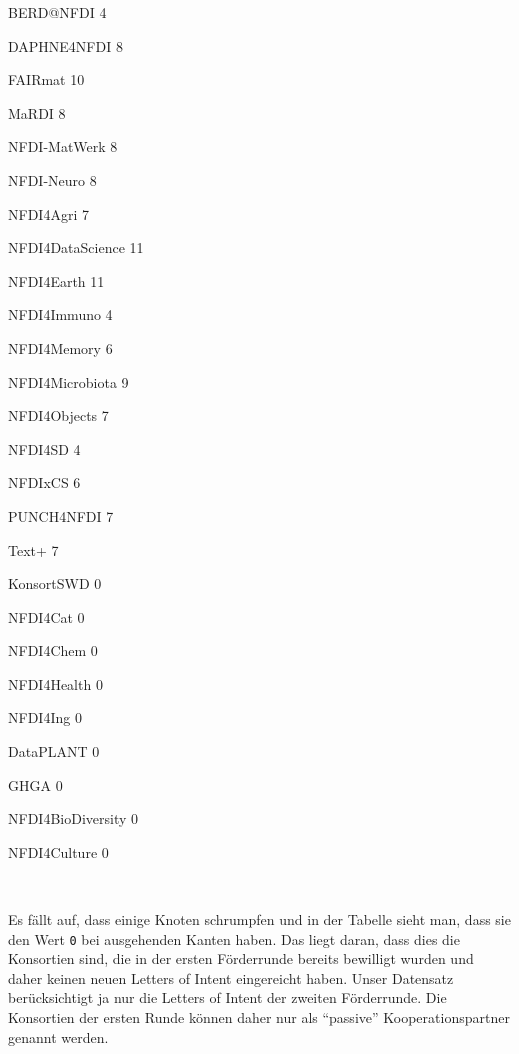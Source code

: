 \documentclass[11pt]{article}
\begin{document}
    \begin{description*}
\item[BERD@NFDI] 4
\item[DAPHNE4NFDI] 8
\item[FAIRmat] 10
\item[MaRDI] 8
\item[NFDI-MatWerk] 8
\item[NFDI-Neuro] 8
\item[NFDI4Agri] 7
\item[NFDI4DataScience] 11
\item[NFDI4Earth] 11
\item[NFDI4Immuno] 4
\item[NFDI4Memory] 6
\item[NFDI4Microbiota] 9
\item[NFDI4Objects] 7
\item[NFDI4SD] 4
\item[NFDIxCS] 6
\item[PUNCH4NFDI] 7
\item[Text+] 7
\item[KonsortSWD] 0
\item[NFDI4Cat] 0
\item[NFDI4Chem] 0
\item[NFDI4Health] 0
\item[NFDI4Ing] 0
\item[DataPLANT] 0
\item[GHGA] 0
\item[NFDI4BioDiversity] 0
\item[NFDI4Culture] 0
\end{description*}


    
    \begin{center}
    \end{center}
    { \hspace*{\fill} \\}
    
    Es fällt auf, dass einige Knoten schrumpfen und in der Tabelle sieht
man, dass sie den Wert \texttt{0} bei ausgehenden Kanten haben. Das
liegt daran, dass dies die Konsortien sind, die in der ersten
Förderrunde bereits bewilligt wurden und daher keinen neuen Letters of
Intent eingereicht haben. Unser Datensatz berücksichtigt ja nur die
Letters of Intent der zweiten Förderrunde. Die Konsortien der ersten
Runde können daher nur als ``passive'' Kooperationspartner genannt
werden.
\end{document}
